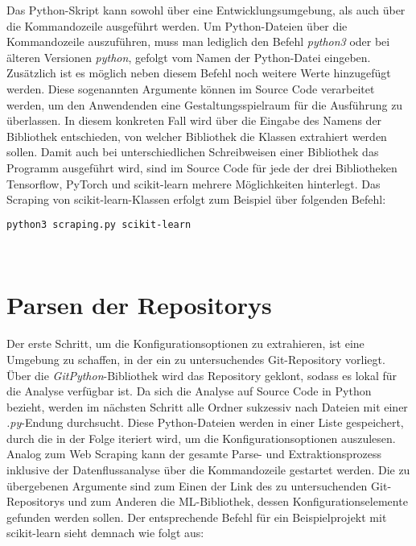 \documentclass[german,bachelor]{swsLeipzig}
\begin{document}
Das Python-Skript kann sowohl über eine Entwicklungsumgebung, als auch über die Kommandozeile ausgeführt werden.
Um Python-Dateien über die Kommandozeile auszuführen, muss man lediglich den Befehl \textit{python3} oder bei älteren
Versionen \textit{python}, gefolgt vom Namen der Python-Datei eingeben.
Zusätzlich ist es möglich neben diesem Befehl noch weitere Werte hinzugefügt werden.
Diese sogenannten Argumente können im Source Code verarbeitet werden, um den Anwendenden eine Gestaltungsspielraum für
die Ausführung zu überlassen.
In diesem konkreten Fall wird über die Eingabe des Namens der Bibliothek entschieden, von welcher Bibliothek die
Klassen extrahiert werden sollen.
Damit auch bei unterschiedlichen Schreibweisen einer Bibliothek das Programm ausgeführt wird, sind im Source Code für jede
der drei Bibliotheken Tensorflow, PyTorch und scikit-learn mehrere Möglichkeiten hinterlegt.
Das Scraping von scikit-learn-Klassen erfolgt zum Beispiel über folgenden Befehl:\\

\noindent\begin{minipage}{\linewidth}
\begin{lstlisting}[language=bash, frame=single, label=scraping_scikit-learn, basicstyle=\small, caption={Kommandozeilenbefehl für das Web Scraping von scikit-learn},captionpos=b]
python3 scraping.py scikit-learn
\end{lstlisting}
\end{minipage}
\

\section{Parsen der Repositorys}
Der erste Schritt, um die Konfigurationsoptionen zu extrahieren, ist eine Umgebung zu schaffen, in der ein zu untersuchendes
Git-Repository vorliegt.
Über die \textit{GitPython}-Bibliothek wird das Repository geklont, sodass es lokal für die Analyse verfügbar ist.
Da sich die Analyse auf Source Code in Python bezieht, werden im nächsten Schritt alle Ordner sukzessiv nach Dateien mit
einer \textit{.py}-Endung durchsucht.
Diese Python-Dateien werden in einer Liste gespeichert, durch die in der Folge iteriert wird, um die Konfigurationsoptionen auszulesen. \\

Analog zum Web Scraping kann der gesamte Parse- und Extraktionsprozess inklusive der Datenflussanalyse über die Kommandozeile gestartet werden.
Die zu übergebenen Argumente sind zum Einen der Link des zu untersuchenden Git-Repositorys und zum Anderen die ML-Bibliothek, dessen
Konfigurationselemente gefunden werden sollen.
Der entsprechende Befehl für ein Beispielprojekt mit scikit-learn sieht demnach wie folgt aus: \\
\end{document}

